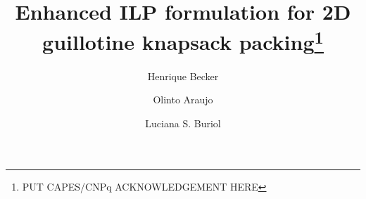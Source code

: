 



\title{Enhanced ILP formulation for 2D guillotine knapsack packing\thanks{
PUT CAPES/CNPq ACKNOWLEDGEMENT HERE
}}


\author{Henrique Becker \and Olinto Araujo \and Luciana S. Buriol}


